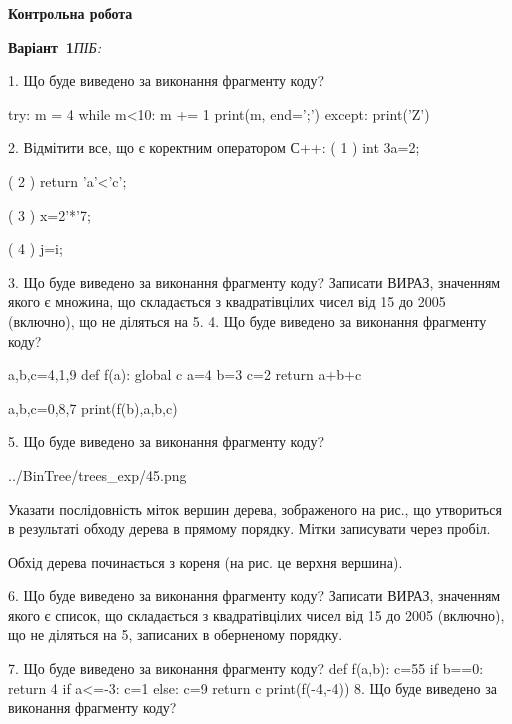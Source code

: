 \documentclass[11pt]{article}
\begin{document}
{\large\textbf{Контрольна робота}}

\textbf{Варіант \No\,1}\hfill \textit{ПІБ:}\,\underline{\hspace{60mm}}
\vspace{4mm}

1. Що буде виведено за виконання фрагменту коду?

try:
    m = 4
    while m<10:
        m += 1
    print(m, end=';')
except:
    print('Z')


2. %
Відмітити все, що є коректним оператором С++:
( 1 ) int 3a=2;

( 2 ) return 'a'<'c';

( 3 ) x=2'*'7;

( 4 ) j=i;

3. Що буде виведено за виконання фрагменту коду?
Записати ВИРАЗ, значенням якого є множина, що складається з квадратівцілих чисел від 15 до 2005 (включно), що не діляться на 5.
4. Що буде виведено за виконання фрагменту коду?

a,b,c=4,1,9
def f(a):
global c    a=4
    b=3
    c=2
    return a+b+c

a,b,c=0,8,7
print(f(b),a,b,c)

5. Що буде виведено за виконання фрагменту коду?

\begin{center}
	{../BinTree/trees_exp/45.png}
\end{center}
Указати послідовність міток вершин дерева, зображеного на рис., що утвориться в результаті обходу дерева в прямому порядку. Мітки записувати через пробіл.\par Обхід дерева починається з кореня (на рис. це верхня вершина).

6. Що буде виведено за виконання фрагменту коду?
Записати ВИРАЗ, значенням якого є список, що складається з квадратівцілих чисел від 15 до 2005 (включно), що не діляться на 5, записаних в обернено\-му порядку.

7. Що буде виведено за виконання фрагменту коду?
def f(a,b):
      c=55
      if b==0: return 4
      if a<=-3: c=1
      else: c=9
      return c
   print(f(-4,-4))
8. Що буде виведено за виконання фрагменту коду?
\end{document}
